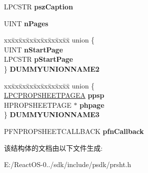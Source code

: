 \begin{DoxyCompactItemize}
\begin{tabbing}
\end{tabbing}\item 
\mbox{\label{struct___p_r_o_p_s_h_e_e_t_h_e_a_d_e_r_a_ae33b92eab9c12cf4490883ec4afba108}} 
L\+P\+C\+S\+TR {\bfseries psz\+Caption}
\item 
\mbox{\label{struct___p_r_o_p_s_h_e_e_t_h_e_a_d_e_r_a_a075d1928f94f75e2145eca4f42907073}} 
U\+I\+NT {\bfseries n\+Pages}
\item 
\mbox{\label{struct___p_r_o_p_s_h_e_e_t_h_e_a_d_e_r_a_a67954c597e2b290ee213676957015625}} 
\begin{tabbing}
xx\=xx\=xx\=xx\=xx\=xx\=xx\=xx\=xx\=\kill
union \{\\
\>UINT {\bfseries nStartPage}\\
\>LPCSTR {\bfseries pStartPage}\\
\} {\bfseries DUMMYUNIONNAME2}\\

\end{tabbing}\item 
\mbox{\label{struct___p_r_o_p_s_h_e_e_t_h_e_a_d_e_r_a_a0435db5b5281bceff07a448a62996027}} 
\begin{tabbing}
xx\=xx\=xx\=xx\=xx\=xx\=xx\=xx\=xx\=\kill
union \{\\
\>\hyperlink{struct___p_r_o_p_s_h_e_e_t_p_a_g_e_a}{LPCPROPSHEETPAGEA} {\bfseries ppsp}\\
\>HPROPSHEETPAGE $\ast$ {\bfseries phpage}\\
\} {\bfseries DUMMYUNIONNAME3}\\

\end{tabbing}\item 
\mbox{\label{struct___p_r_o_p_s_h_e_e_t_h_e_a_d_e_r_a_a2a83ed279fcec76b05d60ee86b5e2da0}} 
P\+F\+N\+P\+R\+O\+P\+S\+H\+E\+E\+T\+C\+A\+L\+L\+B\+A\+CK {\bfseries pfn\+Callback}
\end{DoxyCompactItemize}


该结构体的文档由以下文件生成\+:\begin{DoxyCompactItemize}
\item 
E\+:/\+React\+O\+S-\/0../sdk/include/psdk/prsht.\+h\end{DoxyCompactItemize}
